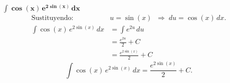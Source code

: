 $\displaystyle \mathbf{\int \cos(x)\,e^{2\sin(x)}\,dx}$
\nopagebreak
\begin{align*}
\text{Sustituyendo: } &u = \sin(x) \;\;\Rightarrow\; du = \cos(x)\,dx. \\[6pt]
\int \cos(x)\,e^{2\sin(x)}\,dx
&= \int e^{2u}\,du \\[6pt]
&= \frac{e^{2u}}{2} + C \\[6pt]
&= \frac{e^{2\sin(x)}}{2} + C
\end{align*}
\[
\boxed{\displaystyle 
\int \cos(x)\,e^{2\sin(x)}\,dx = \frac{e^{2\sin(x)}}{2} + C.}
\]
